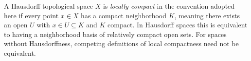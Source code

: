 
A Hausdorff topological space $X$ is \emph{locally compact} in the convention adopted here if every point $x\in X$ has a compact neighborhood $K$, meaning there exists an open $U$ with $x\in U\subseteq K$ and $K$ compact. In Hausdorff spaces this is equivalent to having a neighborhood basis of relatively compact open sets. For spaces without Hausdorffness, competing definitions of local compactness need not be equivalent.
